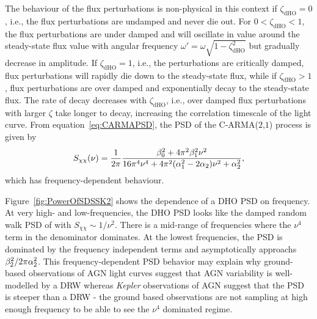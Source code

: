\documentclass[a4paper,fleqn,usenatbib]{mnras}
\begin{document}
The behaviour of the flux perturbations is non-physical in this context if $\zeta_{\mathrm{dHO}} = 0$, i.e., the flux perturbations are undamped and never die out. For $0 < \zeta_{\mathrm{dHO}} < 1$, the flux perturbations are under damped and will oscillate in value around the steady-state flux value with angular frequency $\omega' = \omega\sqrt{1 - \zeta_{\mathrm{dHO}}^{2}}$ but gradually decrease in amplitude. If $\zeta_{\mathrm{dHO}} = 1$, i.e., the perturbations are critically damped, flux perturbations will rapidly die down to the steady-state flux, while if $\zeta_{\mathrm{dHO}} > 1$, flux perturbations are over damped and exponentially decay to the steady-state flux. The rate of decay decreases with $\zeta_{\mathrm{dHO}}$, i.e., over damped flux perturbations with larger $\zeta$ take longer to decay, increasing the correlation timescale of the light curve. From equation~\eqref{eq:CARMAPSD}, the PSD of the C-ARMA($2$,$1$) process is given by
\begin{equation}\label{eq:CARMA21PSD}
S_{\chi\chi}(\nu) = \frac{1}{2\pi}\frac{\beta_{0}^{2} + 4\pi^{2}\beta_{1}^{2}\nu^{2}}{16\pi^{4}\nu^{4} + 4\pi^{2}(\alpha_{1}^{2}-2\alpha_{2})\nu^{2} + \alpha_{2}^{2}},
\end{equation} 
which has frequency-dependent behaviour. 

Figure~\ref{fig:PowerOfSDSSK2} shows the dependence of a DHO PSD on frequency. At very high- and low-frequencies, the DHO PSD looks like the damped random walk PSD of \citet{Kelly09} with $S_{\chi\chi} \sim 1/\nu^{2}$. There is a mid-range of frequencies where the $\nu^{4}$ term in the denominator dominates. At the lowest frequencies, the PSD is dominated by the frequency independent terms and asymptotically approachs $\beta_{2}^{2}/2\pi \alpha_{2}^{2}$. This frequency-dependent PSD behavior may explain why ground-based observations of AGN light curves suggest that AGN variability is well-modelled by a DRW whereas \textit{Kepler} observations of AGN suggest that the PSD is steeper than a DRW - the ground based observations are not sampling at high enough frequency to be able to see the $\nu^{4}$ dominated regime. 
\end{document}
